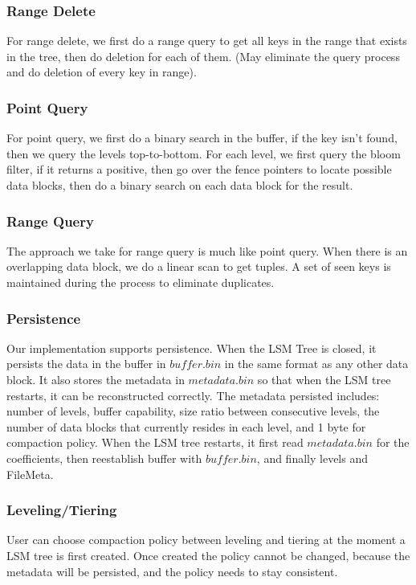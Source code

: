 \documentclass[sigconf]{acmart}
\begin{document}
    \subsubsection{Range Delete}
    For range delete, we first do a range query to get all keys in the range that exists in the tree, then do deletion for each of them. (May eliminate the query process and do deletion of every key in range).
    \subsubsection{Point Query}
    For point query, we first do a binary search in the buffer, if the key isn't found, then we query the levels top-to-bottom. For each level, we first query the bloom filter, if it returns a positive, then go over the fence pointers to locate possible data blocks, then do a binary search on each data block for the result.
    \subsubsection{Range Query}
    The approach we take for range query is much like point query. When there is an overlapping data block, we do a linear scan to get tuples. A set of seen keys is maintained during the process to eliminate duplicates. 
    \subsubsection{Persistence}
    Our implementation supports persistence. When the LSM Tree is closed, it persists the data in the buffer in $buffer$.$bin$ in the same format as any other data block. It also stores the metadata in $metadata$.$bin$ so that when the LSM tree restarts, it can be reconstructed correctly. The metadata persisted includes: number of levels, buffer capability, size ratio between consecutive levels, the number of data blocks that currently resides in each level, and 1 byte for compaction policy. When the LSM tree restarts, it first read $metadata$.$bin$ for the coefficients, then reestablish buffer with $buffer$.$bin$, and finally levels and FileMeta.
    
    \subsubsection{Leveling/Tiering}
    User can choose compaction policy between leveling and tiering at the moment a LSM tree is first created. Once created the policy cannot be changed, because the metadata will be persisted, and the policy needs to stay consistent.
    
\end{document}
